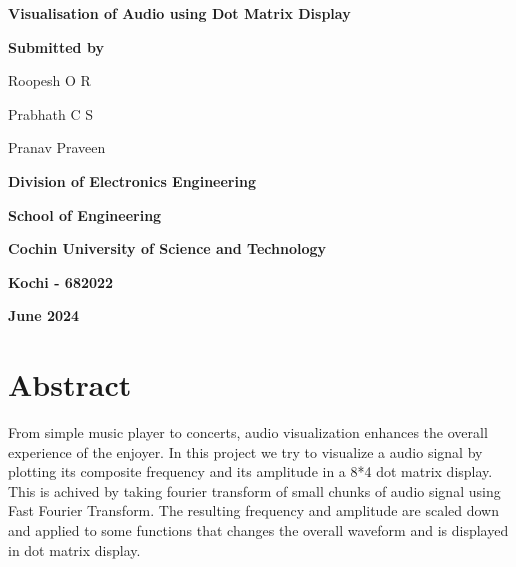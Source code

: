 \documentclass[12pt, a4paper]{article}
\begin{document}
\begin{titlepage}
	\centering
	{\Huge\bfseries Visualisation of Audio using Dot Matrix Display \par}
	\vspace{1.7cm}
	{\Large \textbf{Submitted by} \par}
	\vspace{1cm}
	{\large Roopesh O R\par}
	{\large Prabhath C S\par}
	{\large Pranav Praveen\par}
	\vspace{2cm}

	\par
	\vspace{.3cm}
	{\large \bfseries Division of Electronics Engineering \par}
	{\large \bfseries School of Engineering \par}
	{\large \bfseries Cochin University of Science and Technology \par}
	{\large \bfseries Kochi - 682022 \par}
	\vspace{.5cm}
	{\large \bfseries June 2024 \par}

	\vfill

\end{titlepage}


\newcommand{\usection}[1]{
	\section*{\center \Huge #1}
	\addcontentsline{toc}{section}{\protect\numberline{}#1}
}
\newcommand{\usubsection}[1]{
	\section*{\LARGE #1}
	\addcontentsline{toc}{subsection}{\protect\numberline{}#1}
}

\vspace*{2cm}
\usection{Abstract}
\vspace{.5cm}
From simple music player to concerts, audio visualization
enhances the overall experience of the enjoyer. In this
project we try to visualize a audio signal by plotting
its composite frequency and its amplitude in a 8*4 dot matrix display.
This is achived by taking fourier transform of small chunks of
audio signal using Fast Fourier Transform. The resulting frequency and
amplitude are scaled down and applied to some functions that changes the overall waveform and is displayed in dot matrix display.
\end{document}
